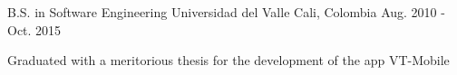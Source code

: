 

\begin{cventries}

  \cventry
    {B.S. in Software Engineering} %
    {Universidad del Valle} %
    {Cali, Colombia} %
    {Aug. 2010 - Oct. 2015} %
    {
      \begin{cvitems} %
        \item {Graduated with a meritorious thesis for the development of the app VT-Mobile}
      \end{cvitems}
    }

\end{cventries}
